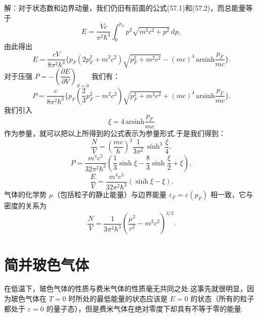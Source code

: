 \begin{xiti}
解：对于状态数和边界动量，我们仍旧有前面的公式(57.1)和(57.2)，而总能量等于
\begin{equation*}
  E=\frac{Vc}{\pi^2\hbar^3}\int_0^{p_F}p^2\sqrt{m^2c^2+p^2}\,\mathrm{d}p,
\end{equation*}
由此得出
\begin{equation*}
  E=\frac{cV}{8\pi^2\hbar^3}\biggl\{p_F\left(2p_F^2+m^2c^2\right)
  \sqrt{p_F^2+m^2c^2}-(mc)^4\,\mathrm{arsinh}\frac{p_F}{mc}\biggr\}.
\end{equation*}
对于压强 $P=-\left(\dfrac{\partial E}{\partial V}\right)_{S=0}$ 我们有：
\begin{equation*}
  P=\frac{c}{8\pi^2\hbar^3}\biggl\{p_F\left(\frac{2}{3}p_F^2-m^2c^2\right)
  \sqrt{p_F^2+m^2c^2}+(mc)^4\,\mathrm{arsinh}\frac{p_F}{mc}\biggr\}.
\end{equation*}
我们引入
\begin{equation*}
  \xi=4\,\mathrm{arsinh}\frac{p_F}{mc}
\end{equation*}
作为参量，就可以把以上所得到的公式表示为参量形式.于是我们得到：
\begin{equation*}
  \frac{N}{V}=\left(\frac{mc}{\hbar}\right)^3\frac{1}{3\pi^2}\,
  \sinh^3\frac{\xi}{4},
\end{equation*}
\begin{equation*}
  P=\frac{m^4c^5}{32\pi^2\hbar^3}\left(\frac{1}{3}\sinh\xi
  -\frac{8}{3}\sinh\frac{\xi}{2}+\xi\right),
\end{equation*}
\begin{equation*}
  \frac{E}{V}=\frac{m^4c^5}{32\pi^2\hbar^3}\left(\sinh\xi-\xi\right).
\end{equation*}
气体的化学势 $\mu$（包括粒子的静止能量）与边界能量 $\varepsilon_F=\varepsilon(p_F)$ 相一致，它与密度的关系为
\begin{equation*}
  \frac{N}{V}=\frac{1}{3\pi^2\hbar^3}
  \left(\frac{\mu^2}{c^2}-m^2c^2\right)^{3/2}.
\end{equation*}

\end{xiti}

\section{简并玻色气体}

在低温下，玻色气体的性质与费米气体的性质毫无共同之处.这事先就很明显，因为玻色气体在 $T=0$ 时所处的最低能量的状态应该是 $E=0$ 的状态（所有的粒子都处于 $\varepsilon=0$ 的量子态），但是费米气体在绝对零度下却具有不等于零的能量.


